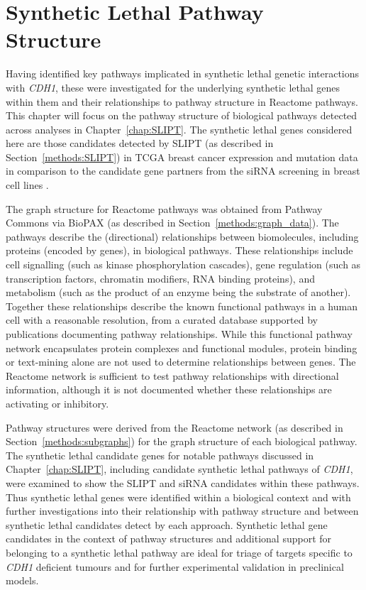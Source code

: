 \chapter{Synthetic Lethal Pathway Structure}
\label{chap:Pathways}
  
Having identified key pathways implicated in synthetic lethal genetic interactions with \textit{CDH1}, these were investigated for the underlying synthetic lethal genes within them and their relationships to pathway structure in Reactome pathways. This chapter will focus on the pathway structure of biological pathways detected across analyses in Chapter~\ref{chap:SLIPT}. The synthetic lethal genes considered here are those candidates detected by SLIPT (as described in Section~\ref{methods:SLIPT}) in TCGA breast cancer expression and mutation data \citep{TCGA2012} in comparison to the candidate gene partners from the siRNA screening in breast cell lines \citep{Telford2015}. 

The graph structure for Reactome pathways was obtained from Pathway Commons via \gls{BioPAX} (as described in Section~\ref{methods:graph_data}). The pathways describe the (directional) relationships between biomolecules, including proteins (encoded by genes), in biological pathways. These relationships include cell signalling (such as kinase phosphorylation cascades), gene regulation (such as transcription factors, chromatin modifiers, RNA binding proteins), and metabolism (such as the product of an enzyme being the substrate of another). Together these relationships describe the known functional pathways in a human cell with a reasonable resolution, from a curated database supported by publications documenting pathway relationships.  While this functional pathway network encapsulates protein complexes and functional modules, protein binding or text-mining alone are not used to determine relationships between genes. The Reactome network is sufficient to test pathway relationships with directional information, although it is not documented whether these relationships are activating or inhibitory.

Pathway structures were derived from the Reactome network (as described in Section~\ref{methods:subgraphs}) for the graph structure of each biological pathway. The synthetic lethal candidate genes for notable pathways discussed in Chapter~\ref{chap:SLIPT}, including candidate synthetic lethal pathways of \textit{CDH1}, were examined to show the SLIPT and siRNA candidates within these pathways. Thus synthetic lethal genes were identified within a biological context and with further investigations into their relationship with pathway structure and between synthetic lethal candidates detect by each approach. Synthetic lethal gene candidates in the context of pathway structures and additional support for belonging to a synthetic lethal pathway are ideal for triage of targets specific to \textit{CDH1} deficient tumours and for further experimental validation in preclinical models.

